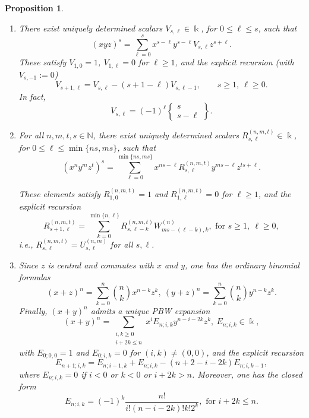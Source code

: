 \documentclass{amsart}
\newtheorem{proposition}[theorem]{Proposition}
\theoremstyle{definition}
\theoremstyle{remark}
\numberwithin{equation}{section}
\begin{document}
\begin{proposition}
\begin{enumerate}
\item [\rm (3)] There exist uniquely determined scalars $V_{s,\ell}\in\Bbbk$, for $0\le \ell\le s$, such that
\begin{equation}\label{Vdefcase5ii}
(xyz)^s=\sum_{\ell=0}^{s} x^{ s-\ell} y^{ s-\ell} V_{s,\ell} z^{ s+\ell}.
\end{equation}
These satisfy $V_{1,0}=1$, $V_{1,\ell}=0$ for $\ell\ge 1$, and the explicit recursion {\rm (}with $V_{s,-1}:=0${\rm )}
\begin{equation}\label{Vreccase5ii}
V_{s+1,\ell}=V_{s,\ell}-(s+1-\ell) V_{s,\ell-1},
\qquad s\ge 1,\ \ell\ge 0.
\end{equation}
In fact,
\begin{equation}\label{Vclosedcase5ii}
V_{s,\ell}=(-1)^{\ell}\left\{\!\!\begin{matrix} s\\ s-\ell\end{matrix}\!\!\right\}.
\end{equation}

\item [\rm (4)] For all $n,m,t,s\in\mathbb N$, there exist uniquely determined scalars $R^{(n,m,t)}_{s,\ell}\in\Bbbk$,
for $0\le \ell\le \min\{ns,ms\}$, such that
\begin{equation}\label{Rdefcase5ii}
(x^n y^m z^t)^s=\sum_{\ell=0}^{\min\{ns,ms\}} x^{ns-\ell} R^{(n,m,t)}_{s,\ell} y^{ms-\ell}z^{ts+\ell}.
\end{equation}

These elements satisfy $R^{(n,m,t)}_{1,0}=1$ and $R^{(n,m,t)}_{1,\ell}=0$ for $\ell\ge 1$, and the explicit recursion
\begin{equation}\label{Rreccase5ii}
R^{(n,m,t)}_{s+1,\ell}=\sum_{k=0}^{\min\{n,\ell\}}R^{(n,m,t)}_{s,\ell-k} W^{(n)}_{ms-(\ell-k), k},
\text{ for } s\ge 1,\ \ell\ge 0,
\end{equation}
i.e., $R^{(n,m,t)}_{s,\ell}=U^{(n,m)}_{s,\ell}$ for all $s,\ell$.

\item [\rm (5)] Since $z$ is central and commutes with $x$ and $y$, one has the ordinary binomial formulas
\[
(x+z)^n=\sum_{k=0}^{n}\binom{n}{k}x^{n-k}z^{k},\ (y+z)^n=\sum_{k=0}^{n}\binom{n}{k}y^{n-k}z^{k}.
\]
Finally, $(x+y)^n$ admits a unique PBW expansion
\begin{equation}\label{Edefcase5ii}
(x+y)^n=\sum_{\substack{i,k\ge 0\\ i+2k\le n}} x^{i} E_{n;i,k} y^{ n-i-2k} z^{k},
\ E_{n;i,k}\in\Bbbk,
\end{equation}
with $E_{0;0,0}=1$ and $E_{0;i,k}=0$ for $(i,k)\neq(0,0)$, and the explicit recursion
\begin{equation}\label{Ereccase5ii}
E_{n+1;i,k}=E_{n;i-1,k}+E_{n;i,k}-(n+2-i-2k) E_{n;i,k-1},
\end{equation}
where $E_{n;i,k}=0$ if $i<0$ or $k<0$ or $i+2k>n$.
Moreover, one has the closed form
\begin{equation}\label{Eclosedcase5ii}
E_{n;i,k}=(-1)^k \frac{n!}{i! (n-i-2k)! k! 2^{k}}, \text{ for } i+2k\le n.
\end{equation}
\end{enumerate}
\end{proposition}
\end{document}
